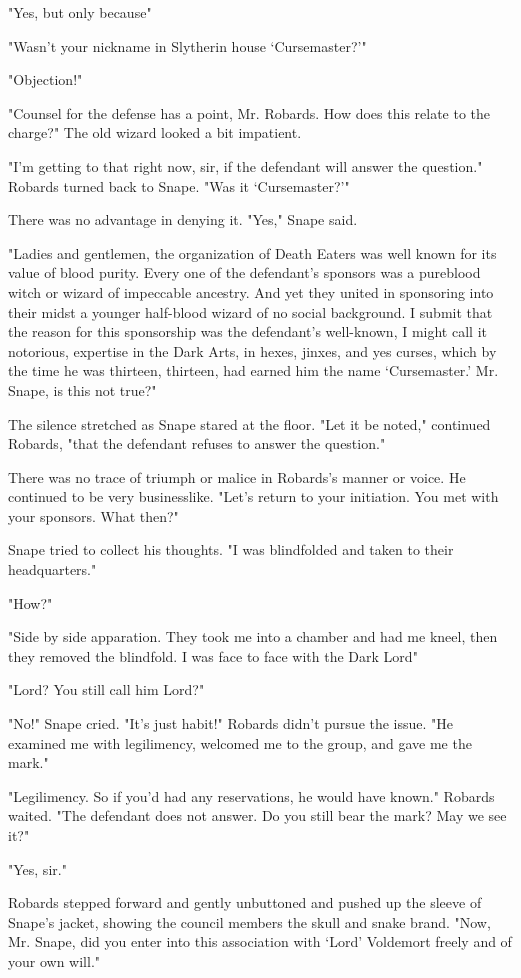 "Yes, but only because{\el}"

"Wasn't your nickname in Slytherin house `Cursemaster?'"

"Objection!"

"Counsel for the defense has a point, Mr. Robards. How does this relate to the charge?" The old wizard looked a bit impatient.

"I'm getting to that right now, sir, if the defendant will answer the question." Robards turned back to Snape. "Was it `Cursemaster?'"

There was no advantage in denying it. "Yes," Snape said.

"Ladies and gentlemen, the organization of Death Eaters was well known for its value of blood purity. Every one of the defendant's sponsors was a pureblood witch or wizard of impeccable ancestry. And yet they united in sponsoring into their midst a younger half-blood wizard of no social background. I submit that the reason for this sponsorship was the defendant's well-known, I might call it notorious, expertise in the Dark Arts, in hexes, jinxes, and yes curses, which by the time he was thirteen, thirteen, had earned him the name `Cursemaster.' Mr. Snape, is this not true?"

The silence stretched as Snape stared at the floor. "Let it be noted," continued Robards, "that the defendant refuses to answer the question."

There was no trace of triumph or malice in Robards's manner or voice. He continued to be very businesslike. "Let's return to your initiation. You met with your sponsors. What then?"

Snape tried to collect his thoughts. "I was blindfolded and taken to their headquarters."

"How?"

"Side by side apparation. They took me into a chamber and had me kneel, then they removed the blindfold. I was face to face with the Dark Lord{\el}"

"Lord? You still call him Lord?"

"No!" Snape cried. "It's just habit!" Robards didn't pursue the issue. "He examined me with legilimency, welcomed me to the group, and gave me the mark."

"Legilimency. So if you'd had any reservations, he would have known." Robards waited. "The defendant does not answer. Do you still bear the mark? May we see it?"

"Yes, sir."

Robards stepped forward and gently unbuttoned and pushed up the sleeve of Snape's jacket, showing the council members the skull and snake brand. "Now, Mr. Snape, did you enter into this association with `Lord' Voldemort freely and of your own will."

